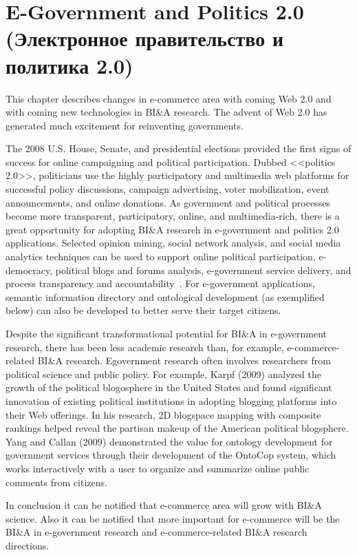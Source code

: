 \section{E-Government and Politics 2.0 (Электронное правительство и политика 2.0)}

This chapter describes changes in e-commerce area with coming Web 2.0
and with coming new technologies in BI\&A research. The advent of Web 2.0 has generated much excitement for
reinventing governments. 

The 2008 U.S. House, Senate, and
presidential elections provided the first signs of success for
online campaigning and political participation. Dubbed
<<politics 2.0>>, politicians use the highly participatory and
multimedia web platforms for successful policy discussions,
campaign advertising, voter mobilization, event announcements,
and online donations. As government and political
processes become more transparent, participatory, online, and
multimedia-rich, there is a great opportunity for adopting
BI\&A research in e-government and politics 2.0 applications.
Selected opinion mining, social network analysis, and social
media analytics techniques can be used to support online
political participation, e-democracy, political blogs and
forums analysis, e-government service delivery, and process
transparency and accountability~\cite{Chen:2006}. For e-government applications, semantic information
directory and ontological development (as exemplified below)
can also be developed to better serve their target citizens.

Despite the significant transformational potential for BI\&A in
e-government research, there has been less academic research
than, for example, e-commerce-related BI\&A research. Egovernment
research often involves researchers from political
science and public policy. For example, Karpf (2009) analyzed
the growth of the political blogosphere in the United
States and found significant innovation of existing political
institutions in adopting blogging platforms into their Web
offerings. In his research, 2D blogspace mapping with composite
rankings helped reveal the partisan makeup of the
American political blogsphere. Yang and Callan (2009)
demonstrated the value for ontology development for government
services through their development of the OntoCop
system, which works interactively with a user to organize and
summarize online public comments from citizens.

In conclusion it can be notified that e-commerce area will grow with BI\&A science. Also it can be notified that more important for e-commerce will be the BI\&A in e-government research and e-commerce-related BI\&A research directions.